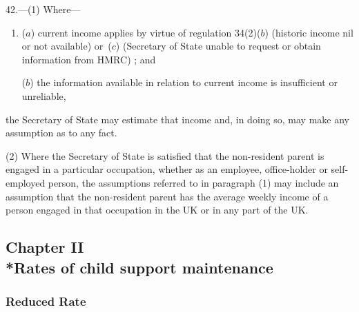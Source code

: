 \documentclass[12pt,a4paper]{article}
\begin{document}
42.---(1)  Where—
\begin{enumerate}\item[]
($a$) current income applies by virtue of 
regulation 34(2)($b$)  
(historic income 
nil or  %
not available)
or~($c$)  (Secretary of State unable to request or obtain information from HMRC)%
; and

($b$) the information available in relation to current income is insufficient or unreliable,
\end{enumerate}
the Secretary of State may estimate that income and, in doing so, may make any assumption as to any fact.

(2) Where the Secretary of State is satisfied that the non-resident parent is engaged in a particular occupation, whether as an employee, office-holder or self-employed person, the assumptions referred to in paragraph (1) may include an assumption that the non-resident parent has the average weekly income of a person engaged in that occupation in the UK or in any part of the UK.


\subsection[Chapter II --- Rates of child support maintenance]{Chapter II\\*Rates of child support maintenance}

\renewcommand\parthead{--- Part IV Chapter II}

\subsubsection[43. Reduced Rate]{Reduced Rate}
\end{document}
